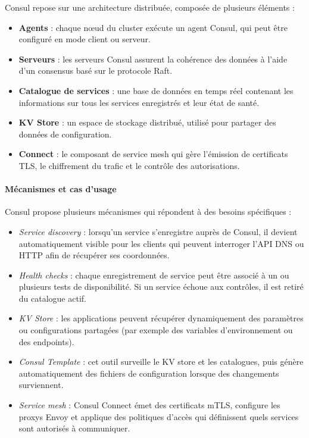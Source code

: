 Consul repose sur une architecture distribuée, composée de plusieurs éléments :
\begin{itemize}
	\item \textbf{Agents} : chaque nœud du cluster exécute un agent Consul, qui peut être configuré en mode client ou serveur.
	\item \textbf{Serveurs} : les serveurs Consul assurent la cohérence des données à l’aide d’un consensus basé sur le protocole Raft.
	\item \textbf{Catalogue de services} : une base de données en temps réel contenant les informations sur tous les services enregistrés et leur état de santé.
	\item \textbf{KV Store} : un espace de stockage distribué, utilisé pour partager des données de configuration.
	\item \textbf{Connect} : le composant de service mesh qui gère l’émission de certificats TLS, le chiffrement du trafic et le contrôle des autorisations.
\end{itemize}

\paragraph{Mécanismes et cas d’usage}

Consul propose plusieurs mécanismes qui répondent à des besoins spécifiques :

\begin{itemize}
	\item \emph{Service discovery} : lorsqu’un service s’enregistre auprès de Consul, il devient automatiquement visible pour les clients qui peuvent interroger l’API DNS ou HTTP afin de récupérer ses coordonnées.
	\item \emph{Health checks} : chaque enregistrement de service peut être associé à un ou plusieurs tests de disponibilité. Si un service échoue aux contrôles, il est retiré du catalogue actif.
	\item \emph{KV Store} : les applications peuvent récupérer dynamiquement des paramètres ou configurations partagées (par exemple des variables d’environnement ou des endpoints).
	\item \emph{Consul Template} : cet outil surveille le KV store et les catalogues, puis génère automatiquement des fichiers de configuration lorsque des changements surviennent.
	\item \emph{Service mesh} : Consul Connect émet des certificats mTLS, configure les proxys Envoy et applique des politiques d’accès qui définissent quels services sont autorisés à communiquer.
\end{itemize}

